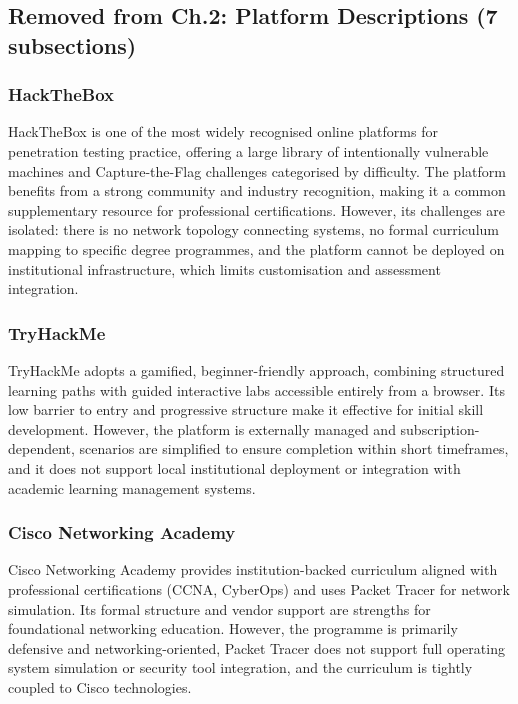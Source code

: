 \documentclass[a4paper,11pt]{article}
\begin{document}
\subsection{Removed from Ch.2: Platform Descriptions (7 subsections)}


\subsubsection{HackTheBox}
HackTheBox \cite{hackthebox} is one of the most widely recognised online platforms for
penetration testing practice, offering a large library of intentionally vulnerable machines and
Capture-the-Flag challenges categorised by difficulty. The platform benefits from a strong
community and industry recognition, making it a common supplementary resource for
professional certifications. However, its challenges are isolated: there is no network topology
connecting systems, no formal curriculum mapping to specific degree programmes, and the
platform cannot be deployed on institutional infrastructure, which limits customisation and
assessment integration.

\subsubsection{TryHackMe}
TryHackMe \cite{tryhackme} adopts a gamified, beginner-friendly approach, combining structured
learning paths with guided interactive labs accessible entirely from a browser. Its low barrier to
entry and progressive structure make it effective for initial skill development. However, the
platform is externally managed and subscription-dependent, scenarios are simplified to ensure
completion within short timeframes, and it does not support local institutional deployment or
integration with academic learning management systems.

\subsubsection{Cisco Networking Academy}
Cisco Networking Academy \cite{cisco_netacad} provides institution-backed curriculum aligned with
professional certifications (CCNA, CyberOps) and uses Packet Tracer for network simulation.
Its formal structure and vendor support are strengths for foundational networking education.
However, the programme is primarily defensive and networking-oriented, Packet Tracer does not
support full operating system simulation or security tool integration, and the curriculum is
tightly coupled to Cisco technologies.
\end{document}
